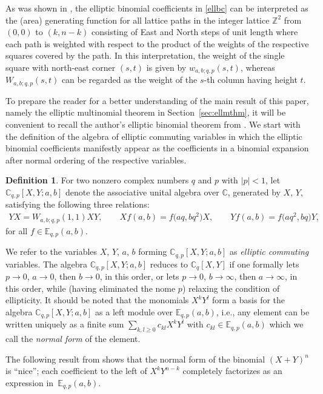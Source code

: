 \documentclass[pdftex]{sigma}
\numberwithin{equation}{section}
\theoremstyle{definition}
\newtheorem{Definition}[Theorem]{Definition}
\newcommand{\C}{\mathbb C}
\newcommand{\E}{\mathbb E}
\newcommand{\Z}{\mathbb Z}
\begin{document}
As was shown in \cite{S1}, the elliptic binomial coefficients
in \eqref{ellbc} can be interpreted as the (area) generating function
for all lattice paths in the integer lattice $\Z^2$ from $(0,0)$ to
$(k,n-k)$ consisting of East and North steps of unit length
where each path is weighted with respect to the product of the
weights of the respective squares covered by the path.
In this interpretation, the weight of the single square with
north-east corner $(s,t)$ is given by $w_{a,b;q,p}(s,t)$,
whereas~$W_{a,b;q,p}(s,t)$ can be regarded as
the weight of the $s$-th column having height $t$.

To prepare the reader for a better understanding of the main result
of this paper, namely the elliptic multinomial theorem in
Section~\ref{sec:ellmthm}, it will be convenient to recall the
author's elliptic binomial theorem from \cite[Theorem~2]{S1}.
We start with the definition of
the algebra of elliptic commuting variables in which the
elliptic binomial coefficients manifestly appear as the
coefficients in a binomial expansion after normal ordering of the
respective variables.

\begin{Definition}\label{defea}
For two nonzero complex numbers $q$ and $p$ with $|p|<1$,
let $\C_{q,p}[X,Y;a,b]$ denote
the associative unital algebra over $\C$,
generated by $X$, $Y$,
satisfying the following three relations:
\begin{align*}
YX=W_{a,b;q,p}(1,1) XY,
\qquad
Xf(a,b)=f\bigl(aq,bq^2\bigr) X,\qquad
Yf(a,b)=f\bigl(aq^2,bq\bigr) Y,
\end{align*}
for all $f\in\E_{q,p}(a,b)$.
\end{Definition}
We refer to the variables $X$, $Y$, $a$, $b$
forming $\C_{q,p}[X,Y;a,b]$
as {\em elliptic commuting} variables.
The algebra $\C_{q,p}[X,Y;a,b]$ reduces to
$\C_{q}[X,Y]$ if one formally lets $p\to 0$, $a\to 0$,
then $b\to 0$, in this order, or lets $p\to 0$, $b\to\infty$,
then $a\to\infty$, in this order, while (having eliminated the nome $p$)
relaxing the condition of ellipticity.
It should be noted that the monomials $X^kY^l$ form a basis for the
algebra $\C_{q,p}[X,Y;a,b]$ as a left module
over $\E_{q,p}(a,b)$,
i.e., any element can be written uniquely as a finite sum
$\sum_{k,l\ge 0} c_{kl}X^kY^l$ with $c_{kl}\in \E_{q,p}(a,b)$
which we call the \textit{normal form} of the element.

The following result from \cite[Theorem~2]{S1}
shows that the normal form of the binomial
${(X+Y)^n}$ is ``nice''; each coefficient to the left of
$X^kY^{n-k}$ completely factorizes as an expression in~$\E_{q,p}(a,b)$.
\end{document}
